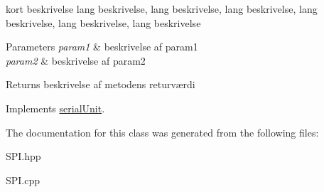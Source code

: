 kort beskrivelse lang beskrivelse, lang beskrivelse, lang beskrivelse, lang beskrivelse, lang beskrivelse, lang beskrivelse 


\begin{DoxyParams}{Parameters}
{\em param1} & beskrivelse af param1 \\
\hline
{\em param2} & beskrivelse af param2 \\
\hline
\end{DoxyParams}
\begin{DoxyReturn}{Returns}
beskrivelse af metodens returværdi 
\end{DoxyReturn}


Implements \hyperlink{classserialUnit_a1e70c25a8057dd67330022a292144900}{serial\+Unit}.



The documentation for this class was generated from the following files\+:\begin{DoxyCompactItemize}
\item 
S\+P\+I.\+hpp\item 
S\+P\+I.\+cpp\end{DoxyCompactItemize}
